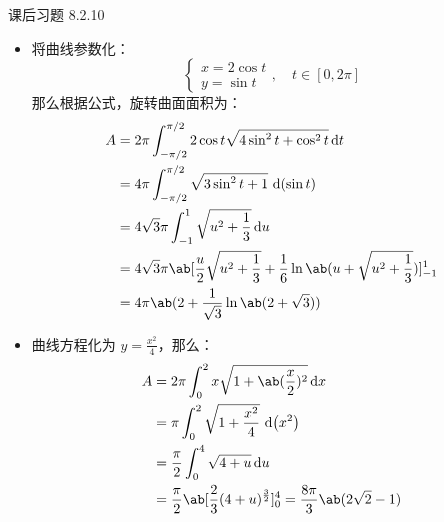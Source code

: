 \begin{problem}
	课后习题 8.2.10

	\begin{solution}
		\begin{itemize}
			\item[\textbf{3)}] 将曲线参数化：
			$$
			\begin{cases}
				x = 2 \cos t \\
				y = \sin t
			\end{cases}, \quad t \in [0, 2\pi]
			$$
			那么根据公式，旋转曲面面积为：
			$$
			\begin{aligned}
				A & = 2\pi \int_{-\pi/2}^{\pi/2} 2 \cos t \sqrt{4 \sin^2 t + \cos^2 t} \dd{t} \\
				& = 4\pi \int_{-\pi/2}^{\pi/2} \sqrt{3 \sin^2 t + 1} \,\dd (\sin t) \\
				& = 4\sqrt{3} \pi \int_{-1}^1 \sqrt{u^2 + \frac{1}{3}} \dd{u} \\
				& = 4\sqrt{3} \pi \ab[\frac{u}{2} \sqrt{u^2 + \frac{1}{3}} + \frac{1}{6} \ln \ab(u + \sqrt{u^2 + \frac{1}{3}})]_{-1}^1 \\
				& = 4\pi \ab(2 + \frac{1}{\sqrt{3}} \ln \ab(2 + \sqrt{3}))
			\end{aligned}
			$$

			\item[\textbf{4)}] 曲线方程化为 $y = \frac{x^2}{4}$，那么：
			$$
			\begin{aligned}
				A & = 2\pi \int_0^2 x \sqrt{1 + \ab(\frac{x}{2})^2} \dd{x} \\
				& = \pi \int_0^2 \sqrt{1 + \frac{x^2}{4}} \,\dd (x^2) \\
				& = \frac{\pi}{2} \int_0^4 \sqrt{4 + u} \dd{u} \\
				& = \frac{\pi}{2} \ab[\frac{2}{3} (4 + u)^{\frac{3}{2}}]_0^4 = \frac{8\pi}{3} \ab(2 \sqrt{2} - 1)
			\end{aligned}
			$$
		\end{itemize}
	\end{solution}
\end{problem}

